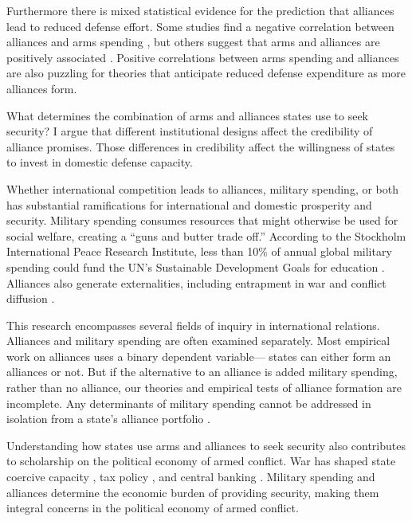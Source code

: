 \documentclass[12pt]{article}
\begin{document}
Furthermore there is mixed statistical evidence for the prediction that alliances lead to reduced defense effort. Some studies find a negative correlation between alliances and arms spending \citep{Conybeare1992, Morrow1993, Kimball2010, DigiuseppePoast2016}, but others suggest that arms and alliances are positively associated \citep{Diehl1994, Horowitzetal2017}. Positive correlations between arms spending and alliances are also puzzling for theories that anticipate reduced defense expenditure as more alliances form. 

What determines the combination of arms and alliances states use to seek security? I argue that different institutional designs affect the credibility of alliance promises. Those differences in credibility affect the willingness of states to invest in domestic defense capacity. 
 
Whether international competition leads to alliances, military spending, or both has substantial ramifications for international and domestic prosperity and security. Military spending consumes resources that might otherwise be used for social welfare, creating a ``guns and butter trade off.'' According to the Stockholm International Peace Research Institute, less than 10\% of annual global military spending could fund the UN's Sustainable Development Goals for education \citep{SIPRI2016}. Alliances also generate externalities, including entrapment in war \citep{Snyder1984} and conflict diffusion \citep{MelinKoch2010}. 

This research encompasses several fields of inquiry in international relations. Alliances and military spending are often examined separately. Most empirical work on alliances uses a binary dependent variable--- states can either form an alliances or not. But if the alternative to an alliance is added military spending, rather than no alliance, our theories and empirical tests of alliance formation are incomplete. Any determinants of military spending cannot be addressed in isolation from a state's alliance portfolio \citep{Nordhausetal2012}.   

Understanding how states use arms and alliances to seek security also contributes to scholarship on the political economy of armed conflict. War has shaped state coercive capacity \citep{Bean1973, Tilly1990}, tax policy \citep{Dinceccoetal2011, ScheveStasavage2012}, and central banking \citep{Poast2015}. Military spending and alliances determine the economic burden of providing security, making them integral concerns in the political economy of armed conflict.  
\end{document}
